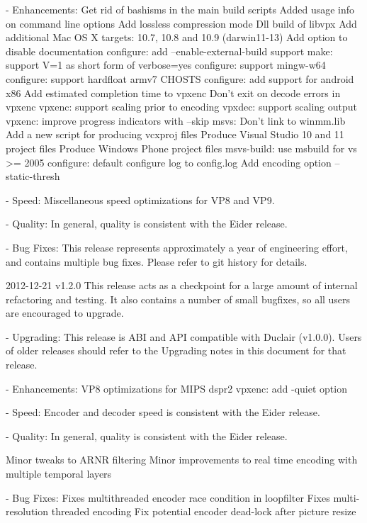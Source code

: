 \begin{DoxyVerbInclude}
  - Enhancements:
      Get rid of bashisms in the main build scripts
      Added usage info on command line options
      Add lossless compression mode
      Dll build of libvpx
      Add additional Mac OS X targets: 10.7, 10.8 and 10.9 (darwin11-13)
      Add option to disable documentation
      configure: add --enable-external-build support
      make: support V=1 as short form of verbose=yes
      configure: support mingw-w64
      configure: support hardfloat armv7 CHOSTS
      configure: add support for android x86
      Add estimated completion time to vpxenc
      Don't exit on decode errors in vpxenc
      vpxenc: support scaling prior to encoding
      vpxdec: support scaling output
      vpxenc: improve progress indicators with --skip
      msvs: Don't link to winmm.lib
      Add a new script for producing vcxproj files
      Produce Visual Studio 10 and 11 project files
      Produce Windows Phone project files
      msvs-build: use msbuild for vs >= 2005
      configure: default configure log to config.log
      Add encoding option --static-thresh

  - Speed:
      Miscellaneous speed optimizations for VP8 and VP9.

  - Quality:
      In general, quality is consistent with the Eider release.

  - Bug Fixes:
      This release represents approximately a year of engineering effort,
      and contains multiple bug fixes. Please refer to git history for details.


2012-12-21 v1.2.0
  This release acts as a checkpoint for a large amount of internal refactoring
  and testing. It also contains a number of small bugfixes, so all users are
  encouraged to upgrade.

  - Upgrading:
    This release is ABI and API compatible with Duclair (v1.0.0). Users
    of older releases should refer to the Upgrading notes in this
    document for that release.

  - Enhancements:
      VP8 optimizations for MIPS dspr2
      vpxenc: add -quiet option

  - Speed:
      Encoder and decoder speed is consistent with the Eider release.

  - Quality:
      In general, quality is consistent with the Eider release.

      Minor tweaks to ARNR filtering
      Minor improvements to real time encoding with multiple temporal layers

  - Bug Fixes:
      Fixes multithreaded encoder race condition in loopfilter
      Fixes multi-resolution threaded encoding
      Fix potential encoder dead-lock after picture resize



\end{DoxyVerbInclude}
